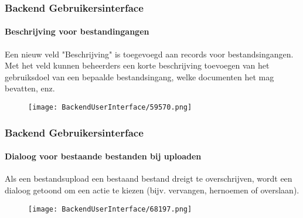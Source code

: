 \begin{frame}[fragile]
	\frametitle{Backend Gebruikersinterface}
	\framesubtitle{Beschrijving voor bestandingangen}

	Een nieuw veld "Beschrijving" is toegevoegd aan records voor bestandsingangen.
	Met het veld kunnen beheerders een korte beschrijving toevoegen van het gebruiksdoel van een bepaalde
	bestandsingang, welke documenten het mag bevatten, enz.

	\begin{figure}
		\texttt{[image: BackendUserInterface/59570.png]}
	\end{figure}

\end{frame}

\begin{frame}[fragile]
	\frametitle{Backend Gebruikersinterface}
	\framesubtitle{Dialoog voor bestaande bestanden bij uploaden}

	Als een bestandsupload een bestaand bestand dreigt te overschrijven, wordt een dialoog getoond
	om een actie te kiezen (bijv. vervangen, hernoemen of overslaan).

	\begin{figure}
		\texttt{[image: BackendUserInterface/68197.png]}
	\end{figure}

\end{frame}


